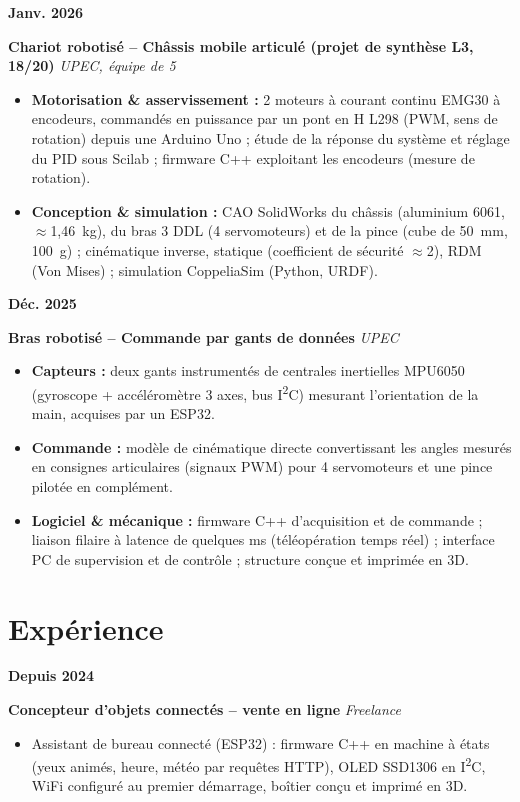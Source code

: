 \documentclass[10pt,a4paper]{article}
\newlength{\datewidth}
\newlength{\projectgap}
\newcommand{\mainproject}[4]{%
    \noindent
    \begin{minipage}[t]{\datewidth}
        \raggedright
        \textbf{#1}
    \end{minipage}%
    \hspace{\projectgap}%
    \begin{minipage}[t]{\dimexpr\linewidth-\datewidth-\projectgap\relax}
        \noindent
        \textbf{#2}%
        \hfill
        \textit{#3}\\[-10pt]
        #4
    \end{minipage}
    \vspace{6pt}
}
\newcommand{\experience}[4]{%
    \noindent
    \begin{minipage}[t]{\datewidth}
        \raggedright
        \textbf{#1}
    \end{minipage}%
    \hspace{\projectgap}%
    \begin{minipage}[t]{\dimexpr\linewidth-\datewidth-\projectgap\relax}
        \noindent
        \textbf{#2}%
        \hfill
        \textit{#3}\\[-10pt]
        #4
    \end{minipage}
    \vspace{0pt}
}
\begin{document}
\mainproject
{Janv. 2026}
{Chariot robotisé -- Châssis mobile articulé (projet de synthèse L3, 18/20)}
{UPEC, équipe de 5}
{%
\begin{itemize}
    \item \textbf{Motorisation \& asservissement :} 2 moteurs à courant continu EMG30 à encodeurs, commandés en puissance par un pont en H L298 (PWM, sens de rotation) depuis une Arduino Uno ; étude de la réponse du système et réglage du PID sous Scilab ; firmware C++ exploitant les encodeurs (mesure de rotation).
    \item \textbf{Conception \& simulation :} CAO SolidWorks du châssis (aluminium 6061, $\approx$1,46~kg), du bras 3 DDL (4 servomoteurs) et de la pince (cube de 50~mm, 100~g) ; cinématique inverse, statique (coefficient de sécurité $\approx$2), RDM (Von Mises) ; simulation CoppeliaSim (Python, URDF).
\end{itemize}
}

\mainproject
{Déc. 2025}
{Bras robotisé -- Commande par gants de données}
{UPEC}
{%
\begin{itemize}
    \item \textbf{Capteurs :} deux gants instrumentés de centrales inertielles MPU6050 (gyroscope + accéléromètre 3 axes, bus I\textsuperscript{2}C) mesurant l'orientation de la main, acquises par un ESP32.
    \item \textbf{Commande :} modèle de cinématique directe convertissant les angles mesurés en consignes articulaires (signaux PWM) pour 4 servomoteurs et une pince pilotée en complément.
    \item \textbf{Logiciel \& mécanique :} firmware C++ d'acquisition et de commande ; liaison filaire à latence de quelques ms (téléopération temps réel) ; interface PC de supervision et de contrôle ; structure conçue et imprimée en 3D.
\end{itemize}
}


\section{Expérience}
\vspace{2pt}

\experience
{Depuis 2024}
{Concepteur d'objets connectés -- vente en ligne}
{Freelance}
{%
\begin{itemize}
    \item Assistant de bureau connecté (ESP32) : firmware C++ en machine à états (yeux animés, heure, météo par requêtes HTTP), OLED SSD1306 en I\textsuperscript{2}C, WiFi configuré au premier démarrage, boîtier conçu et imprimé en 3D.
\end{itemize}
}
\end{document}
